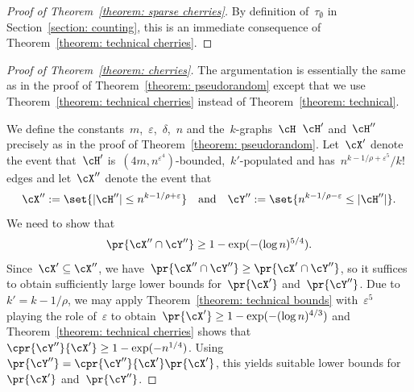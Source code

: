 \documentclass[11pt]{amsart}
\newcommand{\eps}{\varepsilon}
\DeclarePairedDelimiter{\abs}{\lvert}{\rvert}
\newcommand{\qtand}{\quad\text{and}\quad}
\theoremstyle{definition}
\numberwithin{equation}{section}
\begin{document}
	\begin{proof}[Proof of Theorem~\ref{theorem: sparse cherries}]
		By definition of~$\tau_\emptyset$ in Section~\ref{section: counting}, this is an immediate consequence of Theorem~\ref{theorem: technical cherries}.
	\end{proof}

	\begin{proof}[Proof of Theorem~\ref{theorem: cherries}]
		The argumentation is essentially the same as in the proof of Theorem~\ref{theorem: pseudorandom} except that we use Theorem~\ref{theorem: technical cherries} instead of Theorem~\ref{theorem: technical}.

		We define the constants~$m$,~$\eps$,~$\delta$,~$n$ and the~$k$-graphs~$\cH$~$\cH'$ and~$\cH''$ precisely as in the proof of Theorem~\ref{theorem: pseudorandom}.
		Let~$\cX'$ denote the event that~$\cH'$ is~$(4m,n^{\eps^4})$-bounded,~$k'$-populated and has~$n^{k-1/\rho+\eps^5}/k!$ edges and let~$\cX''$ denote the event that
		\begin{equation*}
			\cX'':=\set{\abs{\cH''}\leq n^{k-1/\rho+\eps}}\qtand
			\cY'':=\set{n^{k-1/\rho-\eps}\leq \abs{\cH''}}.
		\end{equation*}
		We need to show that
		\begin{equation*}
			\pr{\cX''\cap \cY''}\geq 1-\exp(-(\log n)^{5/4}).
		\end{equation*}
		Since~$\cX'\subseteq \cX''$, we have~$\pr{\cX''\cap \cY''}\geq \pr{\cX'\cap \cY''}$, so it suffices to obtain sufficiently large lower bounds for~$\pr{\cX'}$ and~$\pr{\cY''}$.
		Due to~$k'= k-1/\rho$, we may apply Theorem~\ref{theorem: technical bounds} with~$\eps^5$ playing the role of~$\eps$ to obtain~$\pr{\cX'}\geq 1-\exp(-(\log n)^{4/3})$ and Theorem~\ref{theorem: technical cherries} shows that~$\cpr{\cY''}{\cX'}\geq 1-\exp(-n^{1/4})$.
		Using~$\pr{\cY''}=\cpr{\cY''}{\cX'}\pr{\cX'}$, this yields suitable lower bounds for~$\pr{\cX'}$ and~$\pr{\cY''}$.
	\end{proof}
	
\end{document}
